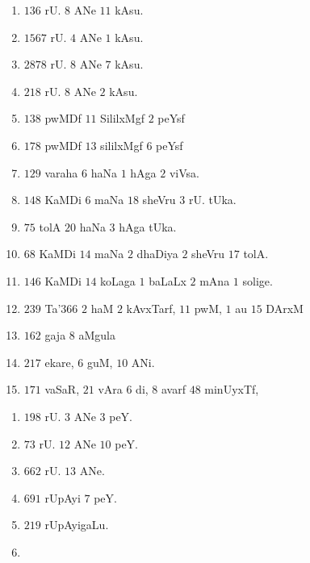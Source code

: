 \begin{multicols}{2}
\begin{enumerate}[$(1)$]
\item $136$ rU. $8$ ANe $11$ kAsu.
\item $1567$ rU. $4$ ANe $1$ kAsu.
\item $2878$ rU. $8$ ANe $7$ kAsu.
\item $218$ rU. $8$ ANe $2$ kAsu.
\item $138$ pwMDf $11$ SililxMgf $2$ peYsf
\item $178$ pwMDf $13$ sililxMgf $6$ peYsf
\item $129$ varaha $6$ haNa $1$ hAga $2$ viVsa.
\item $148$ KaMDi $6$ maNa $18$ sheVru $3$ rU. tUka.
\item $75$ tolA $20$ haNa $3$ hAga tUka.
\item $68$ KaMDi $14$ maNa $2$ dhaDiya $2$ sheVru $17$ tolA.
\item $146$ KaMDi $14$ koLaga $1$ baLaLx $2$ mAna $1$ solige.
\item $239$ Ta{\char'366} $2$ haM $2$ kAvxTarf, $11$ pwM, $1$ au $15$
DArxM
\item $162$ gaja $8$ aMgula
\item $217$ ekare, $6$ guM, $10$ ANi.
\item $171$ vaSaR, $21$ vAra $6$ di, $8$ avarf $48$ minUyxTf,
\end{enumerate}
\end{multicols}


\begin{multicols}{2}
\begin{enumerate}[$(1)$]
\item $198$ rU. $3$ ANe $3$ peY.
\item $73$ rU. $12$ ANe $10$ peY.
\item $662$ rU. $13$ ANe.
\item $691$ rUpAyi $7$ peY.
\item $219$ rUpAyigaLu.
\item[]
\end{enumerate}
\end{multicols}


